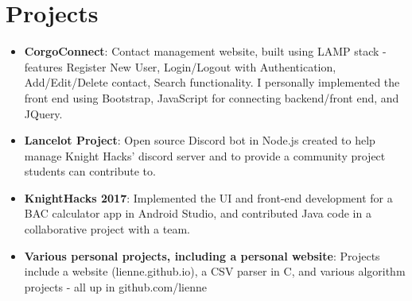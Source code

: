\documentclass[letterpaper,11pt]{article}
\newcommand{\resumeItem}[2]{
  \item\small{
    \textbf{#1}{: #2 \vspace{-2pt}}
  }
}
\newcommand{\resumeSubItem}[2]{\resumeItem{#1}{#2}\vspace{-4pt}}
\newcommand{\resumeSubHeadingListStart}{\begin{itemize}[leftmargin=*]}
\newcommand{\resumeSubHeadingListEnd}{\end{itemize}}
\begin{document}
\section{Projects}
  \resumeSubHeadingListStart
    \resumeSubItem{CorgoConnect}
      {Contact management website, built using LAMP stack - features Register New User, Login/Logout with Authentication, Add/Edit/Delete contact, Search functionality. I personally implemented the front end using Bootstrap, JavaScript for connecting backend/front end, and JQuery.}
    \resumeSubItem{Lancelot Project}
      {Open source Discord bot in Node.js created to help manage Knight Hacks' discord server and to provide a community project students can contribute to.}
    \resumeSubItem{KnightHacks 2017}
      {Implemented the UI and front-end development for a BAC calculator app in Android Studio, and contributed Java code in a collaborative project with a team.}
    \resumeSubItem{Various personal projects, including a personal website}
      {Projects include a website (lienne.github.io), a CSV parser in C, and various algorithm projects - all up in github.com/lienne}
  \resumeSubHeadingListEnd
    
    
\end{document}
